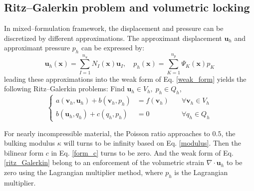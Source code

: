 \subsection{Ritz--Galerkin problem and volumetric locking}
In mixed--formulation framework, the displacement and pressure can be discretized by different approximations. 
The approximant displacement $\boldsymbol u_h$ and approximant pressure $p_h$ can be expressed by:
\begin{equation}
    \boldsymbol u_h(\boldsymbol x) = \sum_{I = 1}^{n_u} N_I(\boldsymbol x) \boldsymbol u_I
    , \quad
    p_h(\boldsymbol x) = \sum_{K = 1}^{n_p} \Psi_K(\boldsymbol x) p_K
\end{equation}
leading these approximations into the weak form of Eq. \eqref{weak_form} yields the following Ritz--Galerkin problems: 
Find $\boldsymbol u_h \in V_h,\;p_h \in Q_h$,
\begin{equation}\label{ritz_Galerkin}
\left \{
\begin{aligned}
    a(\boldsymbol v_h, \boldsymbol u_h) + b(\boldsymbol v_h, p_h) &= f(\boldsymbol v_h) \quad &\forall \boldsymbol v_h \in V_h \\
    b(\boldsymbol u_h, q_h) + c(q_h,p_h) &= 0 \quad &\forall q_h \in Q_h
\end{aligned}
\right .
\end{equation}

For nearly incompressible material, the Poisson ratio approaches to $0.5$, the bulking modulus $\kappa$ will turns to be infinity based on Eq. \eqref{modulus}. 
Then the bilinear form $c$ in Eq. \eqref{form_c} turns to be zero.
And the weak form of Eq. \eqref{ritz_Galerkin} belong to an enforcement of the volumetric strain $\nabla \cdot \boldsymbol u_h$ to be zero using the Lagrangian multiplier method,
where $p_h$ is the Lagrangian multiplier.

